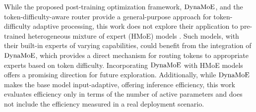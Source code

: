 
While the proposed post-training optimization framework, $\operatorname{DynaMoE}$, and the token-difficulty-aware router provide a general-purpose approach for token-difficulty adaptive processing, this work does not explore their application to pre-trained heterogeneous mixture of expert (HMoE) models  \cite{Wang2024HMoEHM}. Such models, with their built-in experts of varying capabilities, could benefit from the integration of $\operatorname{DynaMoE}$, which provides a direct mechanism for routing tokens to appropriate experts based on token difficulty. Incorporating $\operatorname{DynaMoE}$ with HMoE models offers a promising direction for future exploration. Additionally, while $\operatorname{DynaMoE}$ makes the base model input-adaptive, offering inference efficiency, this work evaluates efficiency only in terms of the number of active parameters and does not include the efficiency measured in a real deployment scenario. 